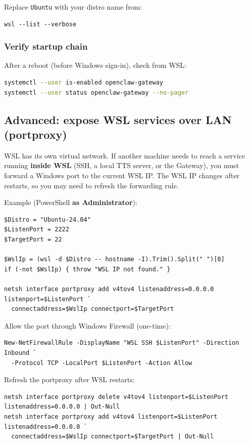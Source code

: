 Replace \texttt{Ubuntu} with your distro name from:

\begin{lstlisting}
wsl --list --verbose
\end{lstlisting}


\subsubsection{Verify startup chain}


After a reboot (before Windows sign-in), check from WSL:

\begin{lstlisting}[language=bash]
systemctl --user is-enabled openclaw-gateway
systemctl --user status openclaw-gateway --no-pager
\end{lstlisting}


\subsection{Advanced: expose WSL services over LAN (portproxy)}


WSL has its own virtual network. If another machine needs to reach a service
running \textbf{inside WSL} (SSH, a local TTS server, or the Gateway), you must
forward a Windows port to the current WSL IP. The WSL IP changes after restarts,
so you may need to refresh the forwarding rule.

Example (PowerShell \textbf{as Administrator}):

\begin{lstlisting}
$Distro = "Ubuntu-24.04"
$ListenPort = 2222
$TargetPort = 22

$WslIp = (wsl -d $Distro -- hostname -I).Trim().Split(" ")[0]
if (-not $WslIp) { throw "WSL IP not found." }

netsh interface portproxy add v4tov4 listenaddress=0.0.0.0 listenport=$ListenPort `
  connectaddress=$WslIp connectport=$TargetPort
\end{lstlisting}


Allow the port through Windows Firewall (one-time):

\begin{lstlisting}
New-NetFirewallRule -DisplayName "WSL SSH $ListenPort" -Direction Inbound `
  -Protocol TCP -LocalPort $ListenPort -Action Allow
\end{lstlisting}


Refresh the portproxy after WSL restarts:

\begin{lstlisting}
netsh interface portproxy delete v4tov4 listenport=$ListenPort listenaddress=0.0.0.0 | Out-Null
netsh interface portproxy add v4tov4 listenport=$ListenPort listenaddress=0.0.0.0 `
  connectaddress=$WslIp connectport=$TargetPort | Out-Null
\end{lstlisting}


